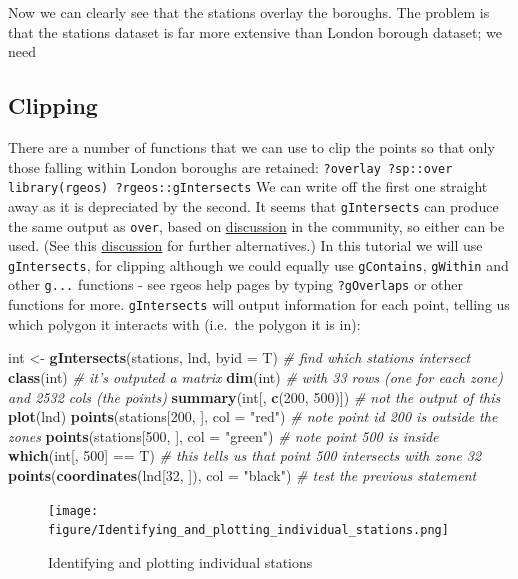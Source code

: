 \documentclass[]{article}
\newenvironment{Shaded}{}{}
\newcommand{\KeywordTok}[1]{\textcolor[rgb]{0.00,0.44,0.13}{\textbf{{#1}}}}
\newcommand{\DataTypeTok}[1]{\textcolor[rgb]{0.56,0.13,0.00}{{#1}}}
\newcommand{\DecValTok}[1]{\textcolor[rgb]{0.25,0.63,0.44}{{#1}}}
\newcommand{\StringTok}[1]{\textcolor[rgb]{0.25,0.44,0.63}{{#1}}}
\newcommand{\CommentTok}[1]{\textcolor[rgb]{0.38,0.63,0.69}{\textit{{#1}}}}
\newcommand{\NormalTok}[1]{{#1}}
\begin{document}
Now we can clearly see that the stations overlay the boroughs. The
problem is that the stations dataset is far more extensive than London
borough dataset; we need

\subsection{Clipping}

There are a number of functions that we can use to clip the points so
that only those falling within London boroughs are retained:
\texttt{?overlay ?sp::over library(rgeos) ?rgeos::gIntersects} We can
write off the first one straight away as it is depreciated by the
second. It seems that \texttt{gIntersects} can produce the same output
as \texttt{over}, based on
\href{http://gis.stackexchange.com/questions/63793/how-to-overlay-a-polygon-over-spatialpointsdataframe-and-preserving-the-spdf-dat}{discussion}
in the community, so either can be used. (See this
\href{http://stackoverflow.com/questions/15881455/how-to-clip-worldmap-with-polygon-in-r}{discussion}
for further alternatives.) In this tutorial we will use
\texttt{gIntersects}, for clipping although we could equally use
\texttt{gContains}, \texttt{gWithin} and other \texttt{g...} functions -
see rgeos help pages by typing \texttt{?gOverlaps} or other functions
for more. \texttt{gIntersects} will output information for each point,
telling us which polygon it interacts with (i.e.~the polygon it is in):

\begin{Shaded}
\begin{Highlighting}[]
\NormalTok{int <- }\KeywordTok{gIntersects}\NormalTok{(stations, lnd, }\DataTypeTok{byid =} \NormalTok{T)  }\CommentTok{# find which stations intersect }
\KeywordTok{class}\NormalTok{(int)  }\CommentTok{# it's outputed a matrix}
\KeywordTok{dim}\NormalTok{(int)  }\CommentTok{# with 33 rows (one for each zone) and 2532 cols (the points)}
\KeywordTok{summary}\NormalTok{(int[, }\KeywordTok{c}\NormalTok{(}\DecValTok{200}\NormalTok{, }\DecValTok{500}\NormalTok{)])  }\CommentTok{# not the output of this}
\KeywordTok{plot}\NormalTok{(lnd)}
\KeywordTok{points}\NormalTok{(stations[}\DecValTok{200}\NormalTok{, ], }\DataTypeTok{col =} \StringTok{"red"}\NormalTok{)  }\CommentTok{# note point id 200 is outside the zones}
\KeywordTok{points}\NormalTok{(stations[}\DecValTok{500}\NormalTok{, ], }\DataTypeTok{col =} \StringTok{"green"}\NormalTok{)  }\CommentTok{# note point 500 is inside}
\KeywordTok{which}\NormalTok{(int[, }\DecValTok{500}\NormalTok{] == T)  }\CommentTok{# this tells us that point 500 intersects with zone 32}
\KeywordTok{points}\NormalTok{(}\KeywordTok{coordinates}\NormalTok{(lnd[}\DecValTok{32}\NormalTok{, ]), }\DataTypeTok{col =} \StringTok{"black"}\NormalTok{)  }\CommentTok{# test the previous statement}
\end{Highlighting}
\end{Shaded}
\begin{figure}[htbp]
\centering
\texttt{[image: figure/Identifying\_and\_plotting\_individual\_stations.png]}
\caption{Identifying and plotting individual stations}
\end{figure}
\end{document}
